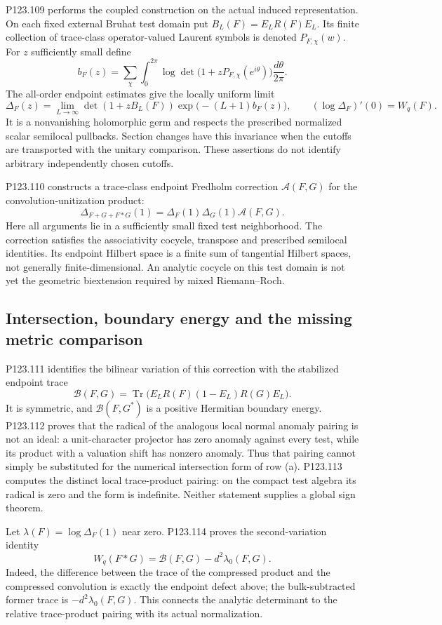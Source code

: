 P123.109 performs the coupled construction on the actual induced
representation. On each fixed external Bruhat test domain put
$B_L(F)=E_LR(F)E_L$. Its finite collection of trace-class
operator-valued Laurent symbols is denoted $P_{F,\chi}(w)$. For $z$
sufficiently small define
\[
 b_F(z)=\sum_\chi\int_0^{2\pi}
 \log\det\bigl(1+zP_{F,\chi}(e^{i\theta})\bigr)
 \frac{d\theta}{2\pi}.
\]
The all-order endpoint estimates give the locally uniform limit
\[
 \Delta_F(z)=\lim_{L\to\infty}
 \det(1+zB_L(F))\exp\bigl(-(L+1)b_F(z)\bigr),
 \qquad (\log\Delta_F)'(0)=W_q(F).
\]
It is a nonvanishing holomorphic germ and respects the prescribed
normalized scalar semilocal pullbacks. Section changes have this
invariance when the cutoffs are transported with the unitary comparison.
These assertions do not identify arbitrary independently chosen cutoffs.

P123.110 constructs a trace-class endpoint Fredholm correction
$\mathcal A(F,G)$ for the convolution-unitization product:
\[
 \Delta_{F+G+F*G}(1)
   =\Delta_F(1)\Delta_G(1)\mathcal A(F,G).
\]
Here all arguments lie in a sufficiently small fixed test neighborhood.
The correction satisfies the associativity cocycle, transpose and
prescribed semilocal identities. Its endpoint Hilbert space is a finite
sum of tangential Hilbert spaces, not generally finite-dimensional.
An analytic cocycle on this test domain is not yet the geometric
biextension required by mixed Riemann--Roch.

\subsection{Intersection, boundary energy and the missing metric comparison}
P123.111 identifies the bilinear variation of this correction with the
stabilized endpoint trace
\[
 \mathcal B(F,G)=\operatorname{Tr}
 \bigl(E_LR(F)(1-E_L)R(G)E_L\bigr).
\]
It is symmetric, and $\mathcal B(F,G^*)$ is a positive Hermitian
boundary energy. P123.112 proves that the radical of the analogous
local normal anomaly pairing is not an ideal: a unit-character
projector has zero anomaly against every test, while its product with
a valuation shift has nonzero anomaly. Thus that pairing cannot simply
be substituted for the numerical intersection form of row (a).
P123.113 computes the distinct local trace-product pairing: on the
compact test algebra its radical is zero and the form is indefinite.
Neither statement supplies a global sign theorem.

Let $\lambda(F)=\log\Delta_F(1)$ near zero. P123.114 proves the
second-variation identity
\[
 W_q(F*G)=\mathcal B(F,G)-d^2\lambda_0(F,G).
\]
Indeed, the difference between the trace of the compressed product and
the compressed convolution is exactly the endpoint defect above;
the bulk-subtracted former trace is $-d^2\lambda_0(F,G)$.
This connects the analytic determinant to the relative trace-product
pairing with its actual normalization.

